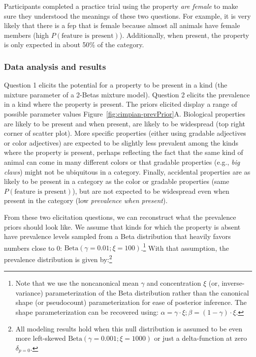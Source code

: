 \documentclass[floatsintext,man]{apa6}
\theoremstyle{definition}
\theoremstyle{definition}
\theoremstyle{definition}
\theoremstyle{remark}
\begin{document}
Participants completed a practice trial using the property \emph{are
female} to make sure they understood the meanings of these two
questions. For example, it is very likely that there is a fep that is
female because almost all animals have female members (high
\(P(\text{feature is present})\)). Additionally, when present, the
property is only expected in about 50\% of the category.

\subsubsection{Data analysis and
results}\label{data-analysis-and-results}

Question 1 elicits the potential for a property to be present in a kind
(the mixture parameter of a 2-Betas mixture model). Question 2 elicits
the prevalence in a kind where the property is present. The priors
elicited display a range of possible parameter values
Figure~\ref{fig:cimpian-prevPrior}A. Biological properties are likely to
be present and when present, are likely to be widespread (top right
corner of scatter plot). More specific properties (either using gradable
adjectives or color adjectives) are expected to be slightly less
prevalent among the kinds where the property is present, perhaps
reflecting the fact that the same kind of animal can come in many
different colors or that gradable properties (e.g., \emph{big claws})
might not be ubiquitous in a category. Finally, accidental properties
are as likely to be present in a category as the color or gradable
properties (same \(P(\text{feature is present})\)), but are not expected
to be widespread even when present in the category (low \emph{prevalence
when present}).

From these two elicitation questions, we can reconstruct what the
prevalence priors should look like. We assume that kinds for which the
property is absent have prevalence levels sampled from a Beta
distribution that heavily favors numbers close to 0:
\(\text{Beta}(\gamma = 0.01; \xi = 100)\).\footnote{Note that we use the
  noncanonical mean \(\gamma\) and concentration \(\xi\) (or,
  inverse-variance) parameterization of the Beta distribution rather
  than the canonical shape (or pseudocount) parameterization for ease of
  posterior inference. The shape parameterization can be recovered
  using: \(\alpha = \gamma \cdot \xi; \beta = (1 - \gamma) \cdot \xi\).}
With that assumption, the prevalence distribution is given by:\footnote{All
  modeling results hold when this null distribution is assumed to be
  even more left-skewed \(\text{Beta}(\gamma = 0.001; \xi = 1000)\) or
  just a delta-function at zero \(\delta_{p=0}\).}
\end{document}
